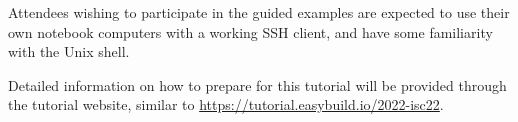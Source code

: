 Attendees wishing to participate in the guided examples are expected to use their
own notebook computers with a working SSH client, and have some familiarity with
the Unix shell.

Detailed information on how to prepare for this tutorial will be provided
through the tutorial website, similar to
\url{https://tutorial.easybuild.io/2022-isc22}.
